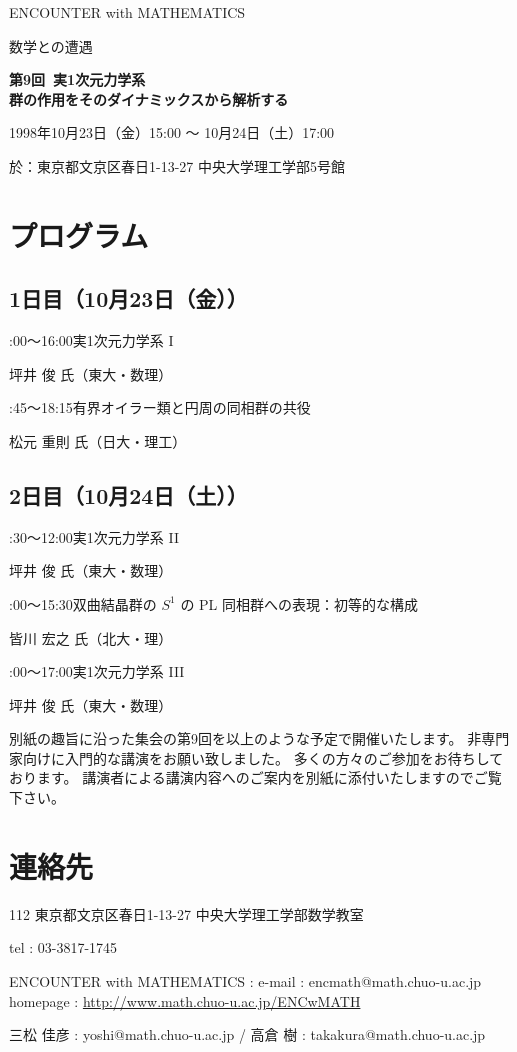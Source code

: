 \documentclass[uplatex,dvipdfmx]{jlreq}
\newcommand{\talk}[3]{%
\noindent
#1\quad #2\par
\hspace*{2em}#3\par\smallskip
}
\newcommand{\EwMnumber}{第9回}
\newcommand{\EwMtitle}{実1次元力学系\\[2mm]\large 群の作用をそのダイナミックスから解析する}
\newcommand{\EwMdate}{1998年10月23日（金）15:00 ～ 10月24日（土）17:00}
\newcommand{\EwMplace}{東京都文京区春日1-13-27 中央大学理工学部5号館}
\newcommand{\EwMtitleblock}{

\vspace*{-5mm}

\begin{center}

{\Large ENCOUNTER with MATHEMATICS}

\vspace{2mm}

{\large 数学との遭遇}

\vspace{4mm}

{\Large \bfseries \EwMnumber\ \EwMtitle}

\vspace{4mm}

\EwMdate

\vspace{2mm}

於：\EwMplace

\end{center}

\vspace{2mm}

}
\begin{document}
\EwMtitleblock


\section*{プログラム}

\subsection*{1日目（10月23日（金））}

\talk
{15:00～16:00}
{実1次元力学系 I}
{坪井 俊 氏（東大・数理）}

\talk
{16:45～18:15}
{有界オイラー類と円周の同相群の共役}
{松元 重則 氏（日大・理工）}

\subsection*{2日目（10月24日（土））}

\talk
{10:30～12:00}
{実1次元力学系 II}
{坪井 俊 氏（東大・数理）}

\talk
{14:00～15:30}
{双曲結晶群の $S^1$ の PL 同相群への表現：初等的な構成}
{皆川 宏之 氏（北大・理）}

\talk
{16:00～17:00}
{実1次元力学系 III}
{坪井 俊 氏（東大・数理）}


\bigskip

別紙の趣旨に沿った集会の第9回を以上のような予定で開催いたします。  
非専門家向けに入門的な講演をお願い致しました。  
多くの方々のご参加をお待ちしております。  
講演者による講演内容へのご案内を別紙に添付いたしますのでご覧下さい。


\section*{連絡先}

112 東京都文京区春日1-13-27 中央大学理工学部数学教室  

tel : 03-3817-1745  

ENCOUNTER with MATHEMATICS : e-mail : encmath@math.chuo-u.ac.jp  
homepage : \url{http://www.math.chuo-u.ac.jp/ENCwMATH}  

三松 佳彦 : yoshi@math.chuo-u.ac.jp / 高倉 樹 : takakura@math.chuo-u.ac.jp
\end{document}
